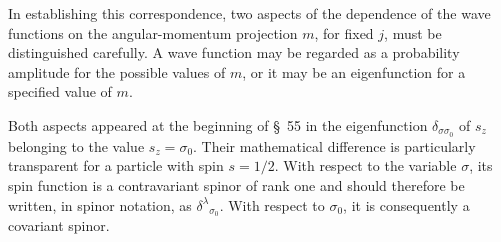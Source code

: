 



In establishing this correspondence, two aspects of the dependence of the
wave functions on the angular-momentum projection $m$, for fixed $j$, must be
distinguished carefully. A wave function may be regarded as a probability
amplitude for the possible values of $m$, or it may be an eigenfunction for a
specified value of $m$.

Both aspects appeared at the beginning of \S~55 in the eigenfunction
$\delta_{\sigma\sigma_0}$ of $s_z$ belonging to the value
$s_z=\sigma_0$. Their mathematical difference is particularly transparent
for a particle with spin $s=1/2$. With respect to the variable $\sigma$, its
spin function is a contravariant spinor of rank one and should therefore be
written, in spinor notation, as $\delta^\lambda{}_{\sigma_0}$. With respect
to $\sigma_0$, it is consequently a covariant spinor.



